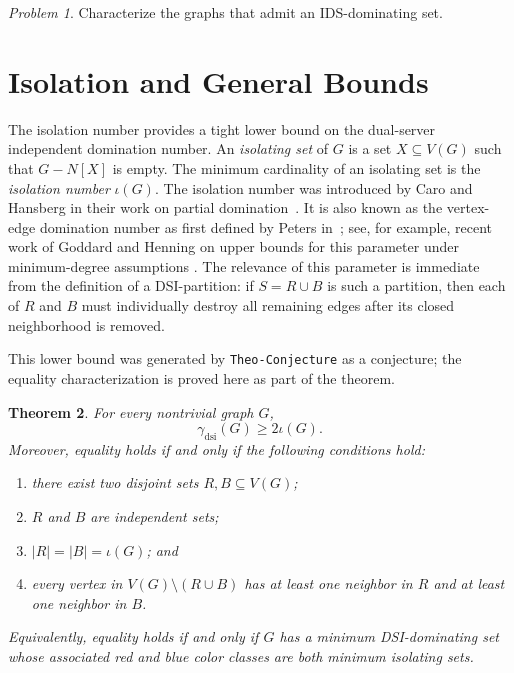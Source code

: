 \documentclass[11pt]{article}
\newtheorem{theorem}{Theorem}
\theoremstyle{definition}
\theoremstyle{remark}
\newtheorem{problem}[theorem]{Problem}
\newcommand{\dsi}{\mathrm{dsi}}
\newcommand{\iso}{\iota}
\DeclareRobustCommand{\TheoConjecture}{\texttt{Theo-Conjecture}}
\begin{document}
\begin{problem}
Characterize the graphs that admit an IDS-dominating set.
\end{problem}

\section{Isolation and General Bounds}

The isolation number provides a tight lower bound on  the dual-server independent domination number. An \emph{isolating set} of \(G\) is a
set \(X\subseteq V(G)\) such that \(G-N[X]\) is empty. The minimum
cardinality of an isolating set is the \emph{isolation number} \(\iso(G)\).
The isolation number was introduced by Caro and Hansberg in their work on
partial domination~\cite{CaroHansberg17}. It is also known as the
vertex-edge domination number as first defined by Peters in~\cite{Peters86}; see, for example, recent work of Goddard and
Henning on upper bounds for this parameter under minimum-degree assumptions
\cite{GoddardHenning25}.
The relevance of this parameter is immediate from the definition of a
DSI-partition: if \(S=R\cup B\) is such a partition, then each of \(R\) and
\(B\) must individually destroy all remaining edges after its closed
neighborhood is removed.

This lower bound was generated by \TheoConjecture{} as a conjecture; the
equality characterization is proved here as part of the theorem.

\begin{theorem}
\label{thm:isolation}
For every nontrivial graph \(G\),
\[
   \gamma_{\dsi}(G)\ge 2\iso(G).
\]
Moreover, equality holds if and only if the following conditions hold:
\begin{enumerate}[label=(\roman*)]
\item there exist two disjoint sets \(R,B\subseteq V(G)\);
\item \(R\) and \(B\) are independent sets;
\item \(|R|=|B|=\iso(G)\); and
\item every vertex in \(V(G)\setminus (R\cup B)\) has at least one neighbor in
      \(R\) and at least one neighbor in \(B\).
\end{enumerate}
Equivalently, equality holds if and only if \(G\) has a minimum
DSI-dominating set whose associated red and blue color classes are both
minimum isolating sets.
\end{theorem}
\end{document}
